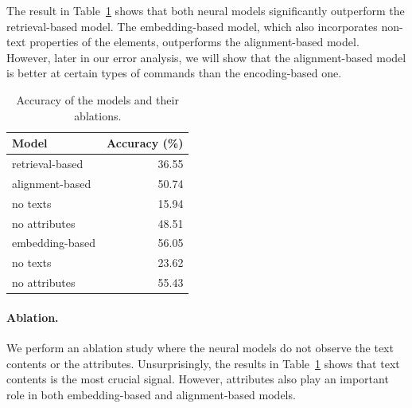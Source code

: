 The result in Table~\ref{tab:webrep-results}
shows that both neural models significantly
outperform the retrieval-based model.
The embedding-based model,
which also incorporates non-text properties of the elements,
outperforms the alignment-based model.
However, later in our error analysis,
we will show that
the alignment-based model is better at certain types
of commands than the encoding-based one.

\begin{table}[t]
\centering
\begin{tabular}{lr}\toprule
\textbf{Model} & \textbf{Accuracy (\%)} \\
\midrule
retrieval-based & 36.55 \\ %
\midrule
alignment-based & 50.74 \\ %
\hspace*{.5em} no texts & 15.94 \\ %
\hspace*{.5em} no attributes & 48.51 \\ %
\midrule
embedding-based & 56.05 \\ %
\hspace*{.5em} no texts & 23.62 \\ %
\hspace*{.5em} no attributes & 55.43 \\ %
\bottomrule
\end{tabular}
\caption{Accuracy of the models and their ablations.
}
\label{tab:webrep-results}
\end{table}

\paragraph{Ablation.}
We perform an ablation study where the neural models
do not observe the text contents or the attributes.
Unsurprisingly, the results in Table~\ref{tab:webrep-results}
shows that text contents is the most crucial signal.
However, attributes also play an important role
in both embedding-based and alignment-based models.

